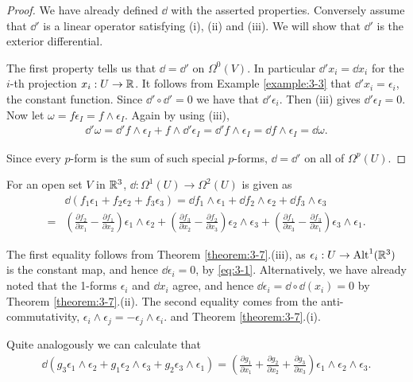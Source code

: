 \begin{proof}
We have already defined $\dd$ with the asserted properties. Conversely assume
that $\dd'$ is a linear operator satisfying (i), (ii) and (iii). We will show that $\dd'$ is
the exterior differential.

The first property tells us that $\dd = \dd'$ on $\Omega^0(V)$. In particular $\dd' x_i = \dd x_i$ for the
$i$-th projection $x_i:U\to{\ensuremath{\mathbb{R}}}$. It follows from Example \ref{example:3-3} that $\dd' x_i = \epsilon_i$, 
the constant function. Since $\dd'\circ\dd' = 0$ we have that $\dd'\epsilon_i$. Then (iii) gives $\dd'\epsilon_I = 0$. 
Now let $\omega = f\epsilon_I = f\wedge\epsilon_I$. Again by using (iii),
\begin{align*}
  \dd'\omega = \dd'f\wedge\epsilon_I + f\wedge \dd'\epsilon_I
  = \dd'f\wedge\epsilon_I
  = \dd f\wedge\epsilon_I
  = \dd\omega.  
\end{align*}

Since every $p$-form is the sum of such special $p$-forms, $\dd = \dd'$ on all of $\Omega^p(U)$.
\end{proof}

For an open set $V$ in ${\mathbb{R}}^3$, $\dd:\Omega^1(U)\to\Omega^2(U)$ is given as 
\begin{align*}
  & \dd(f_1\epsilon_1+f_2\epsilon_2+f_3\epsilon_3)
  = \dd f_1\wedge\epsilon_1+\dd f_2\wedge\epsilon_2+\dd f_3\wedge\epsilon_3 \\
  = & \left(\frac{\partial f_{2}}{\partial x_{1}} - \frac{\partial f_{1}}{\partial x_{2}}\right)\epsilon_{1}\wedge\epsilon_{2}
    + \left(\frac{\partial f_{3}}{\partial x_{2}} - \frac{\partial f_{2}}{\partial x_{3}}\right)\epsilon_{2}\wedge\epsilon_{3}
    + \left(\frac{\partial f_{1}}{\partial x_{3}} - \frac{\partial f_{3}}{\partial x_{1}}\right)\epsilon_{3}\wedge\epsilon_{1}.
\end{align*}

The first equality follows from Theorem \ref{theorem:3-7}.(iii), as $\epsilon_i:U\to\operatorname{Alt}^1({\mathbb{R}}^3)$ is the
constant map, and hence $\dd\epsilon_i=0$, by \eqref{eq:3-1}. Alternatively, we have already noted
that the 1-forms $\epsilon_i$ and $\dd x_i$ agree, and hence $\dd\epsilon_i = \dd\circ\dd(x_i) = 0$ 
by Theorem \ref{theorem:3-7}.(ii). The second equality comes from the anti-commutativity, $\epsilon_i\wedge\epsilon_j = -\epsilon_j\wedge\epsilon_i$.
and Theorem \ref{theorem:3-7}.(i).

Quite analogously we can calculate that
\begin{align*}
  \dd(g_3\epsilon_1\wedge\epsilon_2+g_1\epsilon_2\wedge\epsilon_3+g_2\epsilon_3\wedge\epsilon_1)
  = \left(\frac{\partial g_1}{\partial x_1}+\frac{\partial g_2}{\partial x_2}+\frac{\partial g_3}{\partial x_3}\right)
    \epsilon_1\wedge\epsilon_2\wedge\epsilon_3.
\end{align*}

